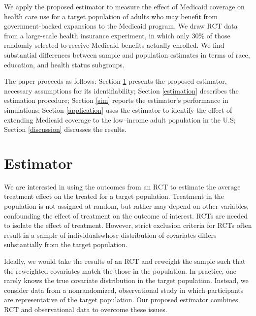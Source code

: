 \documentclass[hidelinks,12pt]{article}
\begin{document}
We apply the proposed estimator to measure the effect of Medicaid coverage on health care use for a target population of adults who may benefit from government-backed expansions to the Medicaid program. We draw RCT data from a large-scale health insurance experiment, in which only $30\%$ of those randomly selected to receive Medicaid benefits actually enrolled. We find substantial differences between sample and population estimates in terms of race, education, and health status subgroups. 

The paper proceeds as follows: Section \ref{estimator} presents the proposed estimator, necessary assumptions for its identifiability; {\color{red}Section \ref{estimation} describes the estimation procedure}; Section \ref{sim} reports the estimator's performance in simulations; Section \ref{application} uses the estimator to identify the effect of extending Medicaid coverage to the low--income adult population in the U.S; Section \ref{discussion} discusses the results. 

\section{Estimator} \label{estimator}
We are interested in using the outcomes from an RCT to estimate the average treatment effect on the treated for a target population. Treatment in the population is not assigned at random, but rather may depend on other variables, confounding the effect of treatment on the outcome of interest. RCTs are needed to isolate the effect of treatment. However, strict exclusion criteria for RCTs often result in a sample {\color{red}of individuals}whose distribution of covariates differs substantially from the target population. 

Ideally, we would take the results of an RCT and reweight the sample such that the reweighted covariates match the those in the population. In practice, one rarely knows the true covariate distribution in the target population. Instead, we consider data from a nonrandomized, observational study in which participants are representative of the target population. Our proposed estimator combines RCT and observational data to overcome these issues.
\end{document}
